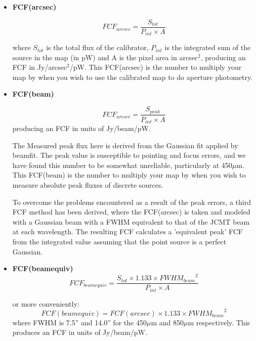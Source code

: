 \documentclass[twoside,11pt]{article}
\renewcommand{\_}{\texttt{\symbol{95}}}
\begin{document}
\begin{itemize}

\item {\textbf{FCF(arcsec)}}

\begin{equation}
\label{eq:fcf_arcsec}
FCF_{arcsec} = \frac{S_{tot}}{P_{int} \times A}
\end{equation}

where $S_{tot}$ is the total flux of the calibrator, $P_{int}$ is the
integrated sum of the source in the map (in pW) and A is the pixel
area in arcsec$^2$, producing an FCF in Jy/arcsec$^2$/pW. This
FCF(arcsec) is the number to multiply your map by when you wish to use
the calibrated map to do aperture photometry.

\item{\textbf{FCF(beam)}}

\begin{equation}
\label{eq:fcf_beam}
FCF_{arcsec} = \frac{S_{peak}}{P_{int} \times A}
\end{equation}
producing an FCF in units of Jy/beam/pW.

The Measured peak flux here is derived from the Gaussian fit applied
by beamfit. The peak value is susceptible to pointing and focus
errors, and we have found this number to be somewhat unreliable,
particularly at 450$\mu$m. This FCF(beam) is the number to multiply
your map by when you wish to measure absolute peak fluxes of discrete
sources.

To overcome the problems encountered as a result of the peak errors, a
third FCF method has been derived, where the FCF(arcsec) is taken and
modeled with a Gaussian beam with a FWHM equivalent to that of the
JCMT beam at each wavelength. The resulting FCF calculates a
'equivalent peak' FCF from the integrated value assuming that the
point source is a perfect Gaussian.

\item{\textbf{FCF(beamequiv)}}
\begin{equation}
\label{eq:fcf_beamequiv}
FCF_{beamequiv}  = \frac{S_{tot} \times 1.133 \times {FWHM_{beam}}^2}{P_{int} \times A}
\end{equation}

 or more conveniently:
\begin{equation}
FCF(beamequiv) = FCF(arcsec) \times 1.133 \times {FWHM_{beam}}^2
\end{equation}
where FWHM is 7.5'' and 14.0'' for the 450$\mu$m and 850$\mu$m
respectively. This produces an FCF in units of Jy/beam/pW.


\end{itemize}
\end{document}
